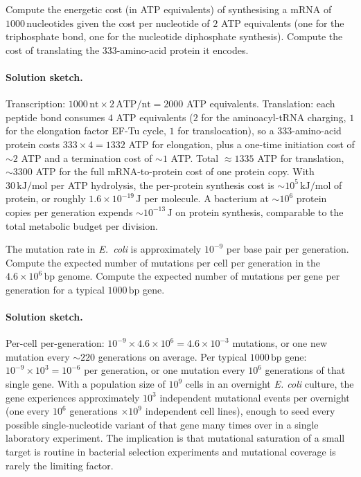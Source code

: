 \begin{exercise}
Compute the energetic cost (in ATP equivalents) of synthesising a
mRNA of $1000\,\text{nucleotides}$ given the cost per nucleotide of
$2$ ATP equivalents (one for the triphosphate bond, one for the
nucleotide diphosphate synthesis). Compute the cost of translating
the $333$-amino-acid protein it encodes.
\end{exercise}

\paragraph{Solution sketch.} Transcription: $1000\,\text{nt} \times
2\,\text{ATP/nt} = 2000$ ATP equivalents. Translation: each peptide
bond consumes $4$ ATP equivalents ($2$ for the aminoacyl-tRNA
charging, $1$ for the elongation factor EF-Tu cycle, $1$ for
translocation), so a $333$-amino-acid protein costs
$333 \times 4 = 1332$ ATP for elongation, plus a one-time initiation
cost of $\sim 2$ ATP and a termination cost of $\sim 1$ ATP. Total
$\approx 1335$ ATP for translation, $\sim 3300$ ATP for the full
mRNA-to-protein cost of one protein copy. With $30\,\text{kJ/mol}$
per ATP hydrolysis, the per-protein synthesis cost is
$\sim 10^5\,\text{kJ/mol}$ of protein, or roughly $1.6 \times
10^{-19}\,\text{J}$ per molecule. A bacterium at $\sim 10^6$ protein
copies per generation expends $\sim 10^{-13}\,\text{J}$ on
protein synthesis, comparable to the total metabolic budget per
division.

\begin{exercise}
The mutation rate in \emph{E.~coli} is approximately $10^{-9}$ per
base pair per generation. Compute the expected number of mutations
per cell per generation in the $4.6 \times 10^6\,\text{bp}$ genome.
Compute the expected number of mutations per gene per generation for
a typical $1000\,\text{bp}$ gene.
\end{exercise}

\paragraph{Solution sketch.} Per-cell per-generation:
$10^{-9} \times 4.6 \times 10^6 = 4.6 \times 10^{-3}$ mutations, or
one new mutation every $\sim 220$ generations on average. Per typical
$1000\,\text{bp}$ gene: $10^{-9} \times 10^3 = 10^{-6}$ per generation,
or one mutation every $10^6$ generations of that single gene. With
a population size of $10^9$ cells in an overnight \emph{E. coli}
culture, the gene experiences approximately $10^3$ independent
mutational events per overnight (one every $10^6$ generations $\times
10^9$ independent cell lines), enough to seed every possible
single-nucleotide variant of that gene many times over in a single
laboratory experiment. The implication is that mutational saturation
of a small target is routine in bacterial selection experiments and
mutational coverage is rarely the limiting factor.

